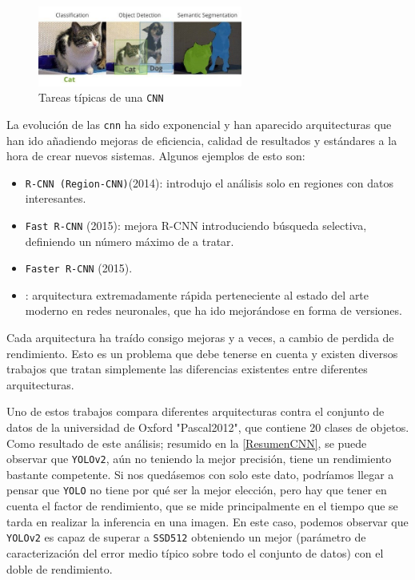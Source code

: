 \begin{figure}[H]
    \centering
    \includegraphics[width=0.6\textwidth]{images/4/TiposTareas.png}
    \caption{Tareas típicas de una \texttt{CNN}\cite{kallfelzsirmacekSEQUENTIALIMAGEPROCESSING2019}}
    \label{fig:tareasCNN}
\end{figure}

La evolución de las \texttt{\acrshort{cnn}} ha sido exponencial y han aparecido arquitecturas que han ido añadiendo mejoras de eficiencia, calidad de resultados y estándares a la hora de crear nuevos 
sistemas. Algunos ejemplos de esto son:
\begin{itemize}
    \item \texttt{R-CNN (Region-CNN)}(2014): introdujo el análisis solo en regiones con datos interesantes.
    \item \texttt{Fast R-CNN} (2015): mejora R-CNN introduciendo búsqueda selectiva, definiendo un número máximo de \texttt{} a tratar.
    \item \texttt{Faster R-CNN} (2015).
    \item \texttt{}\cite{redmonYouOnlyLook2016}: arquitectura extremadamente rápida perteneciente al estado del arte moderno en redes neuronales, que ha ido mejorándose en forma de versiones.
\end{itemize}

Cada arquitectura ha traído consigo mejoras y a veces, a cambio de perdida de rendimiento. Esto es un problema que debe tenerse en cuenta y existen diversos trabajos que tratan simplemente las diferencias 
existentes entre diferentes arquitecturas.

Uno de estos trabajos\cite{hanAdvancedDeepLearningTechniques2018} compara diferentes arquitecturas contra el conjunto de datos de la universidad de Oxford "Pascal2012"\cite{PASCALVisualObject}, que contiene 20 clases de objetos.\newline
Como resultado de este análisis; resumido en la \autoref{ResumenCNN}, se puede observar que \texttt{YOLOv2}, aún no teniendo la mejor precisión, tiene un rendimiento bastante competente. Si nos quedásemos con solo este dato, podríamos llegar a pensar que \texttt{YOLO} 
no tiene por qué ser la mejor elección, pero hay que tener en cuenta el factor de rendimiento, que se mide principalmente en el tiempo que se tarda en realizar la inferencia en una imagen. En este caso, podemos observar 
que \texttt{YOLOv2} es capaz de superar a \texttt{SSD512} obteniendo un mejor \texttt{}(parámetro de caracterización del error medio típico sobre todo el conjunto de datos) con el doble de rendimiento.

